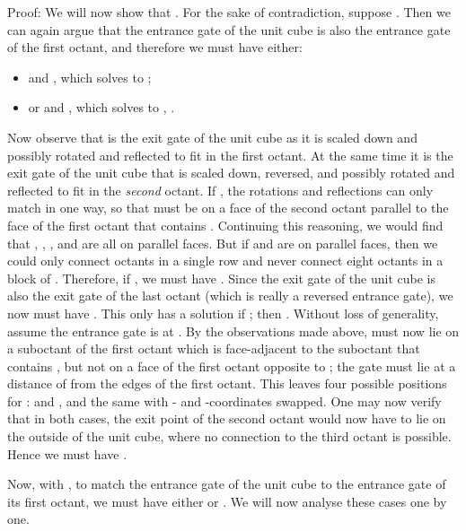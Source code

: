 \documentclass[11pt,a4paper]{article}
\newenvironment{proof}{Proof:}{\qed}
\def\squareforqed{\hbox{\rlap{}}}
\def\qed{\ifmmode\squareforqed\else{\unskip\nobreak\hfil
\penalty50\hskip1em\null\nobreak\hfil\squareforqed
\parfillskip=0pt\finalhyphendemerits=0\endgraf}\fi}
\begin{document}
\begin{proof}
We will now show that . For the sake of contradiction, suppose . Then we can again argue that the entrance gate of the unit cube is also the entrance gate of the first octant, and therefore we must have either:\begin{itemize}
\item  and , which solves to ;
\item or  and , which solves to , .
\end{itemize}
Now observe that  is the exit gate of the unit cube as it is scaled down and possibly rotated and reflected to fit in the first octant. At the same time it is the exit gate of the unit cube that is scaled down, reversed, and possibly rotated and reflected to fit in the \emph{second} octant. If , the rotations and reflections can only match in one way, so that  must be on a face of the second octant parallel to the face of the first octant that contains . Continuing this reasoning, we would find that , , ,  and  are all on parallel faces. But if  and  are on parallel faces, then we could only connect octants in a single row and never connect eight octants in a block of . Therefore, if , we must have . Since the exit gate of the unit cube is also the exit gate of the last octant (which is really a reversed entrance gate), we now must have . This only has a solution if ; then . Without loss of generality, assume the entrance gate  is at . By the observations made above,  must now lie on a suboctant of the first octant which is face-adjacent to the suboctant that contains , but not on a face of the first octant opposite to ; the gate  must lie at a distance of  from the edges of the first octant. This leaves four possible positions for :  and , and the same with - and -coordinates swapped. One may now verify that in both cases, the exit point of the second octant would now have to lie on the outside of the unit cube, where no connection to the third octant is possible. Hence we must have .

Now, with , to match the entrance gate of the unit cube to the entrance gate of its first octant, we must have either  or . We will now analyse these cases one by one.


\end{proof}
\end{document}
